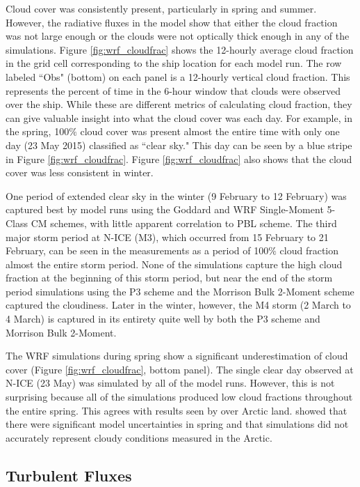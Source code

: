 Cloud cover was consistently present, particularly in spring and summer. However, the radiative fluxes in the model show that either the cloud fraction was not large enough or the clouds were not optically thick enough in any of the simulations. Figure \ref{fig:wrf_cloudfrac} shows the 12-hourly average cloud fraction in the grid cell corresponding to the ship location for each model run. The row labeled ``Obs" (bottom) on each panel is a 12-hourly vertical cloud fraction. This represents the percent of time in the 6-hour window that clouds were observed over the ship. While these are different metrics of calculating cloud fraction, they can give valuable insight into what the cloud cover was each day. For example, in the spring, 100$\%$ cloud cover was present almost the entire time with only one day (23 May 2015) classified as ``clear sky." This day can be seen by a blue stripe in Figure \ref{fig:wrf_cloudfrac}. Figure \ref{fig:wrf_cloudfrac} also shows that the cloud cover was less consistent in winter. 

One period of extended clear sky in the winter (9 February to 12 February) was captured best by model runs using the Goddard and WRF Single-Moment 5-Class CM schemes, with little apparent correlation to PBL scheme. The third major storm period at N-ICE (M3), which occurred from 15 February to 21 February, can be seen in the measurements as a period of 100$\%$ cloud fraction almost the entire storm period. None of the simulations capture the high cloud fraction at the beginning of this storm period, but near the end of the storm period simulations using the P3 scheme and the Morrison Bulk 2-Moment scheme captured the cloudiness. Later in the winter, however, the M4 storm (2 March to 4 March) is captured in its entirety quite well by both the P3 scheme and Morrison Bulk 2-Moment. 

The WRF simulations during spring show a significant underestimation of cloud cover (Figure \ref{fig:wrf_cloudfrac}, bottom panel). The single clear day observed at N-ICE (23 May) was simulated by all of the model runs. However, this is not surprising because all of the simulations produced low cloud fractions throughout the entire spring. This agrees with results seen by \citet{hines:2011} over Arctic land. \citet{hines:2011} showed that there were significant model uncertainties in spring and that simulations did not accurately represent cloudy conditions measured in the Arctic. 

\subsection{Turbulent Fluxes}

